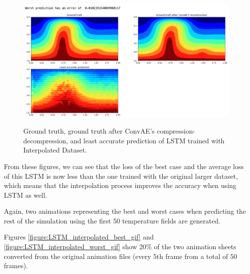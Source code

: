 \begin{figure}[H]
    \caption{Ground truth, ground truth after ConvAE's compression-decompression, and least accurate prediction of LSTM trained with Interpolated Dataset.}
    \includegraphics[scale=0.5]{figures/mantle_convection_images/larger_dataset_interpolated/LSTM_Worst.png}
    \label{figure:LSTM_interpolated_worst}
\end{figure}

From these figures, we can see that the loss of the best case and the average loss of this LSTM is now less than the one trained with the original larger dataset, which means that the interpolation process improves the accuracy when using LSTM as well.

Again, two animations representing the best and worst cases when predicting the rest of the simulation using the first 50 temperature fields are generated.

Figures \ref{figure:LSTM_interpolated_best_gif} and \ref{figure:LSTM_interpolated_worst_gif} show 20\% of the two animation sheets converted from the original animation files (every 5th frame from a total of 50 frames).

